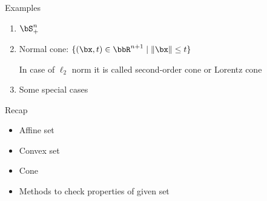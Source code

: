 \documentclass[12pt,russian]{beamer}
\begin{document}
\begin{frame}{Examples}
\begin{enumerate}
\item $\bS^n_+$
\item Normal cone: $\{ (\bx, t) \in \bbR^{n+1} \; | \; \| \bx \| \leq t \}$ 

In case of $\ell_2$ norm it is called second-order cone or Lorentz cone
\item Some special cases
\end{enumerate}
\end{frame}

\begin{frame}{Recap}
\begin{itemize}
\item Affine set
\item Convex set
\item Cone
\item Methods to check properties of given set
\end{itemize}
\end{frame}
\end{document}
